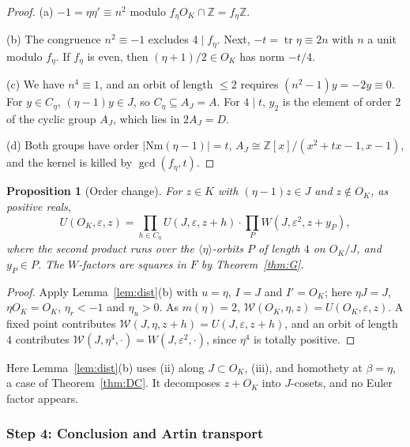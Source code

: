 \documentclass[11pt]{amsart}
\numberwithin{equation}{section}
\theoremstyle{plain}
\newtheorem{proposition}[theorem]{Proposition}
\theoremstyle{definition}
\theoremstyle{remark}
\newcommand{\Nm}{\mathrm{Nm}}
\newcommand{\tr}{\operatorname{tr}}
\begin{document}
\begin{proof}
(a) \(-1=\eta\eta'\equiv n^2\) modulo \(f_\eta O_K\cap\mathbb Z=f_\eta\mathbb Z\).

(b) The congruence \(n^2\equiv-1\) excludes \(4\mid f_\eta\). Next, \(-t=\tr\eta\equiv2n\) with \(n\) a unit modulo \(f_\eta\). If \(f_\eta\) is even, then \((\eta+1)/2\in O_K\) has norm \(-t/4\).

(c) We have \(n^4\equiv1\), and an orbit of length \(\le2\) requires \((n^2-1)y=-2y\equiv0\). For \(y\in C_\eta\), \((\eta-1)y\in J\), so \(C_\eta\subseteq A_J=A\). For \(4\mid t\), \(y_2\) is the element of order \(2\) of the cyclic group \(A_J\), which lies in \(2A_J=D\).

(d) Both groups have order \(|\Nm(\eta-1)|=t\), \(A_J\cong\mathbb Z[x]/(x^2+tx-1,x-1)\), and the kernel is killed by \(\gcd(f_\eta,t)\).
\end{proof}

\begin{proposition}[Order change]\label{prop:orderchange}
For \(z\in K\) with \((\eta-1)z\in J\) and \(z\notin O_K\), as positive reals,
\[U(O_K,\varepsilon,z)=\prod_{h\in C_\eta}U(J,\varepsilon,z+h)\cdot\prod_PW(J,\varepsilon^2,z+y_P),\]
where the second product runs over the \(\langle\eta\rangle\)-orbits \(P\) of length \(4\) on \(O_K/J\), and \(y_P\in P\). The \(W\)-factors are squares in \(F\) by Theorem~\ref{thm:G}.
\end{proposition}

\begin{proof}
Apply Lemma~\ref{lem:dist}(b) with \(u=\eta\), \(I=J\) and \(I'=O_K\); here \(\eta J=J\), \(\eta O_K=O_K\), \(\eta_r<-1\) and \(\eta_u>0\). As \(m(\eta)=2\), \(\mathcal W(O_K,\eta,z)=U(O_K,\varepsilon,z)\). A fixed point contributes \(\mathcal W(J,\eta,z+h)=U(J,\varepsilon,z+h)\), and an orbit of length \(4\) contributes \(\mathcal W(J,\eta^4,\cdot)=W(J,\varepsilon^2,\cdot)\), since \(\eta^4\) is totally positive.
\end{proof}

Here Lemma~\ref{lem:dist}(b) uses (ii) along \(J\subset O_K\), (iii), and homothety at \(\beta=\eta\), a case of Theorem~\ref{thm:DC}. It decomposes \(z+O_K\) into \(J\)-cosets, and no Euler factor appears.

\subsubsection*{Step 4: Conclusion and Artin transport}
\end{document}
